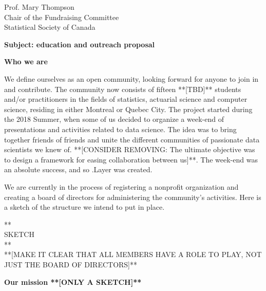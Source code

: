\documentclass[11pt, a4paper]{letter} %
\begin{document}
\begin{letter}{
	Prof. Mary Thompson\\
	Chair of the Fundraising Committee\\
	Statistical Society of Canada
	
	\bigskip
	\textbf{Subject: education and outreach proposal}%
}
\noindent \textbf{Who we are}

We define ourselves as an open community, looking forward for anyone to join in and contribute. The community now consists of fifteen **[TBD]** students and/or practitioners in the fields of statistics, actuarial science and computer science, residing in either Montreal or Quebec City. The project started during the 2018 Summer, when some of us decided to organize a week-end of presentations and activities related to data science. The idea was to bring together friends of friends and unite the different communities of passionate data scientists we knew of. **[CONSIDER REMOVING: The ultimate objective was to design a framework for easing collaboration between us]**. The week-end was an absolute success, and so .Layer was created.

We are currently in the process of registering a nonprofit organization and creating a board of directors for administering the community's activities. Here is a sketch of the structure we intend to put in place.

**\\

SKETCH\\

**\\

**[MAKE IT CLEAR THAT ALL MEMBERS HAVE A ROLE TO PLAY, NOT JUST THE BOARD OF DIRECTORS]**


\noindent \textbf{Our mission **[ONLY A SKETCH]**}


\end{letter}
\end{document}
